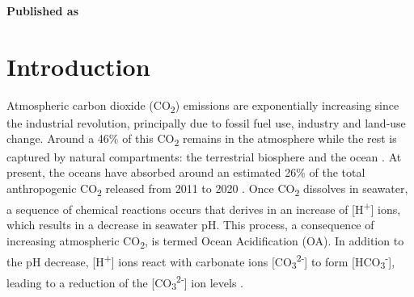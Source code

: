 \vspace{3cm}





\textbf{Published as}

\vspace{0.5cm}


\newpage
\section{Introduction}

Atmospheric carbon dioxide (CO\textsubscript{2}) emissions are
exponentially increasing since the industrial revolution, principally due to
fossil fuel use, industry and land-use change. Around a 46\% of this
CO\textsubscript{2} remains in the atmosphere while the rest is captured by
natural compartments: the terrestrial biosphere and the
ocean \cite{Friedlingstein2021}.  At present, the oceans have absorbed around
an
estimated 26\% of the total anthropogenic CO\textsubscript{2} released from
2011 to 2020 \cite{Friedlingstein2021}. Once CO\textsubscript{2} dissolves in
seawater, a sequence of chemical reactions occurs that derives in an increase
of [H\textsuperscript{+}] ions, which results in a decrease in seawater pH.
This process, a consequence of increasing atmospheric CO\textsubscript{2}, is
termed Ocean Acidification (OA)\cite{caldeira2003anthropogenic}. In addition to
the pH decrease, [H\textsuperscript{+}] ions react with carbonate ions
    [CO\textsubscript{3}\textsuperscript{2-}] to form
    [HCO\textsubscript{3}\textsuperscript{-}], leading to a reduction of the
    [CO\textsubscript{3}\textsuperscript{2-}] ion levels \cite{doney2009ocean}.

